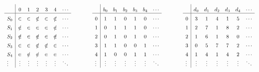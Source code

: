 \[
\setlength{\extrarowheight}{5pt}%
\begin{array}{l|*{6}{c}}
	       &  0     &  1     &  2     &  3      &  4     & \cdots \\
	\hline
	S_0    & \in    &  \in   & \notin & \in     & \notin & \cdots \\
	S_1    & \notin &  \in   & \in    & \in     & \notin & \cdots \\
	S_2    & \notin &  \in   & \notin & \in     & \notin & \cdots \\
	S_3    & \in    & \in    & \notin & \notin  & \in    & \cdots \\
	S_4    & \in    & \notin & \notin & \in     & \in    & \cdots \\
	\vdots & \vdots & \vdots & \vdots & \vdots  & \vdots & \ddots \\
\end{array}
\qquad \qquad
\setlength{\extrarowheight}{5pt}
\begin{array}{l|*{6}{c}}
	       &  b_0   &  b_1   &  b_2   &  b_3    &  b_4   & \cdots \\
	\hline
	  0    &  1     &  1     &  0     &  1      &  0     & \cdots \\
	  1    &  0     &  1     &  1     &  1      &  0     & \cdots \\
	  2    &  0     &  1     &  0     &  1      &  0     & \cdots \\
	  3    &  1     &  1     &  0     &  0      &  1     & \cdots \\
	  4    &  1     &  0     &  0     &  1      &  1     & \cdots \\
	\vdots & \vdots & \vdots & \vdots & \vdots  & \vdots & \ddots \\
\end{array}
\qquad \qquad
\setlength{\extrarowheight}{5pt}
\begin{array}{l|*{6}{c}}
	       &  d_0   &  d_1   &  d_2   &  d_3    &  d_4   & \cdots \\
	\hline
	0      &  3     &  1     &  4     &  1      &  5     & \cdots \\
	1      &  2     &  7     &  1     &  8      &  2     & \cdots \\
	2      &  1     &  6     &  1     &  8      &  0     & \cdots \\
	3      &  0     &  5     &  7     &  7      &  2     & \cdots \\
	4      &  1     &  4     &  1     &  4      &  2     & \cdots \\
	\vdots & \vdots & \vdots & \vdots & \vdots  & \vdots & \ddots \\
\end{array}
\]
